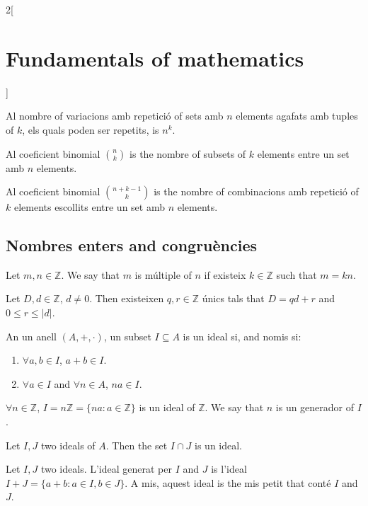 \documentclass[../../../main.tex]{subfiles}
\begin{document}
\begin{multicols}{2}[\section{Fundamentals of mathematics}]
\begin{prop}
    Al nombre of variacions amb repetició of sets amb $n$ elements agafats amb tuples of $k$, els quals poden ser repetits, is $n^k$.
    \end{prop}
    \begin{prop}
    Al coeficient binomial $\binom{n}{k}$ is the nombre of subsets of $k$ elements entre un set amb $n$ elements.
    \end{prop}
    \begin{prop}
    Al coeficient binomial $\binom{n+k-1}{k}$ is the nombre of combinacions amb repetició of $k$ elements escollits entre un set amb $n$ elements.
    \end{prop}
    \subsection{Nombres enters and congruències}
    \begin{definition}
    Let $m,n\in\mathbb{Z}$. We say that $m$ is múltiple of $n$ if existeix $k\in\mathbb{Z}$ such that $m=kn$.
    \end{definition}
    \begin{theorem}
    Let $D,d\in\mathbb{Z}$, $d\ne 0$. Then existeixen $q,r\in\mathbb{Z}$ únics tals that $D=qd+r$ and $0\leq r\leq|d|$.
    \end{theorem}
    \begin{definition}
    An un anell $(A,+,\cdot)$, un subset $I\subseteq A$ is un ideal si, and nomis si:
    \begin{enumerate}
        \item $\forall a,b\in I$, $a+b\in I$.
        \item $\forall a\in I$ and $\forall n\in A$, $na\in I$.
    \end{enumerate}
    \end{definition}
    \begin{lemma}
    $\forall n\in\mathbb{Z}$, $I=n\mathbb{Z}=\{na: a\in\mathbb{Z}\}$ is un ideal of $\mathbb{Z}$. We say that $n$ is un generador of $I$.
    \end{lemma}
    \begin{lemma}
    Let $I,J$ two ideals of $A$. Then the set $I\cap J$ is un ideal.
    \end{lemma}
    \begin{lemma}
    Let $I,J$ two ideals. L'ideal generat per $I$ and $J$ is l'ideal $I+J=\{a+b: a\in I,b\in J\}$. A mis, aquest ideal is the mis petit that conté $I$ and $J$.
    \end{lemma}

\end{multicols}
\end{document}
